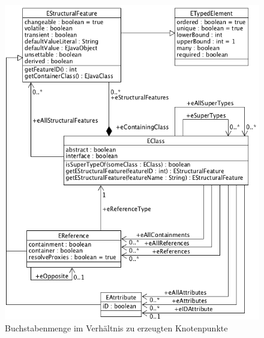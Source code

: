 \begin{figure}
\centering
\includegraphics[width=\linewidth]{Abschnitte/Abbildungen/Grafiken/EMF}
\caption{Buchstabenmenge im Verhältnis zu erzeugten Knotenpunkte}
\label{fig:Characters-and-Nodes}
\end{figure}
